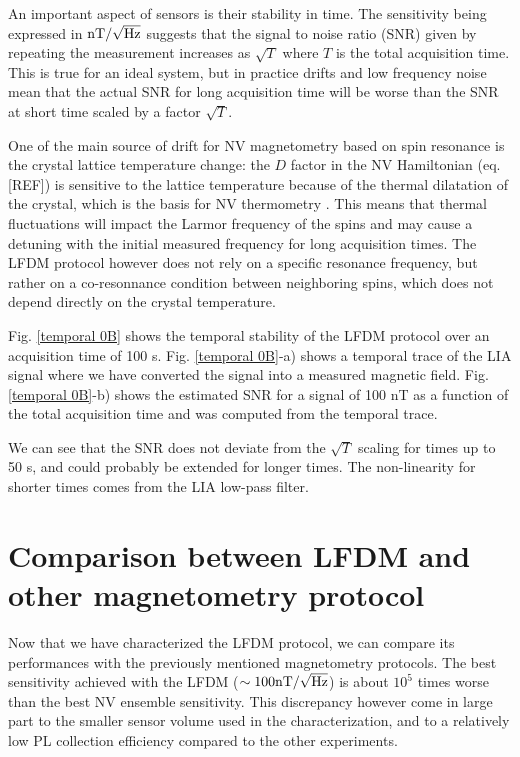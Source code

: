 \documentclass[a4paper,11pt]{report}
\begin{document}
An important aspect of sensors is their stability in time. The sensitivity being expressed in $\rm{nT} / \sqrt{\rm Hz}$ suggests that the signal to noise ratio (SNR) given by repeating the measurement increases as $\sqrt{T}$ where $T$ is the total acquisition time. This is true for an ideal system, but in practice drifts and low frequency noise mean that the actual SNR for long acquisition time will be worse than the SNR at short time scaled by a factor $\sqrt{T}$.

One of the main source of drift for NV magnetometry based on spin resonance is the crystal lattice temperature change: the $D$ factor in the NV Hamiltonian (eq. [REF]) is sensitive to the lattice temperature because of the thermal dilatation of the crystal, which is the basis for NV thermometry \citep{kucsko2013nanometre}. This means that thermal fluctuations will impact the Larmor frequency of the spins and may cause a detuning with the initial measured frequency for long acquisition times. The LFDM protocol however does not rely on a specific resonance frequency, but rather on a co-resonnance condition between neighboring spins, which does not depend directly on the crystal temperature.

Fig. \ref{temporal 0B} shows the temporal stability of the LFDM protocol over an acquisition time of 100 s. Fig. \ref{temporal 0B}-a) shows a temporal trace of the LIA signal where we have converted the signal into a measured magnetic field. Fig. \ref{temporal 0B}-b) shows the estimated SNR for a signal of 100 nT as a function of the total acquisition time and was computed from the temporal trace.

We can see that the SNR does not deviate from the $\sqrt{T}$ scaling for times up to 50 s, and could probably be extended for longer times. The non-linearity for shorter times comes from the LIA low-pass filter.

\section{Comparison between LFDM and other magnetometry protocol}
\label{sec 4.6}
Now that we have characterized the LFDM protocol, we can compare its performances with the previously mentioned magnetometry protocols. The best sensitivity achieved with the LFDM ($\sim 100 \rm{nT} / \sqrt{\rm Hz}$) is about $10^5$ times worse than the best NV ensemble sensitivity. This discrepancy however come in large part to the smaller sensor volume used in the characterization, and to a relatively low PL collection efficiency compared to the other experiments.
\end{document}
